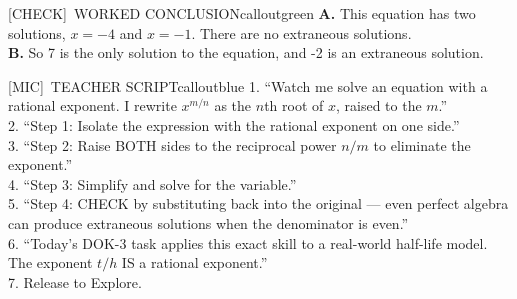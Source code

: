 \documentclass[11pt]{article}
\newcommand{\IconCheck}{[CHECK]}
\newcommand{\IconMic}{[MIC]}
\newcommand{\teacheranswerbox}[2]{%
  \begin{callout}{#1}{calloutgreen}
  #2
  \end{callout}
}
\begin{document}
\teacheranswerbox{\IconCheck\ WORKED CONCLUSION}{%
\textbf{A.} This equation has two solutions, \(x = -4\) and \(x = -1\). There are no extraneous solutions.\\
\textbf{B.} So 7 is the only solution to the equation, and -2 is an extraneous solution.
}

\begin{callout}{\IconMic\ TEACHER SCRIPT}{calloutblue}
1. ``Watch me solve an equation with a rational exponent. I rewrite \(x^{m/n}\) as the \(n\)th root of \(x\), raised to the \(m\).''\\
2. ``Step 1: Isolate the expression with the rational exponent on one side.''\\
3. ``Step 2: Raise BOTH sides to the reciprocal power \(n/m\) to eliminate the exponent.''\\
4. ``Step 3: Simplify and solve for the variable.''\\
5. ``Step 4: CHECK by substituting back into the original — even perfect algebra can produce extraneous solutions when the denominator is even.''\\
6. ``Today's DOK-3 task applies this exact skill to a real-world half-life model. The exponent \(t/h\) IS a rational exponent.''\\
7. Release to Explore.
\end{callout}
\end{document}
